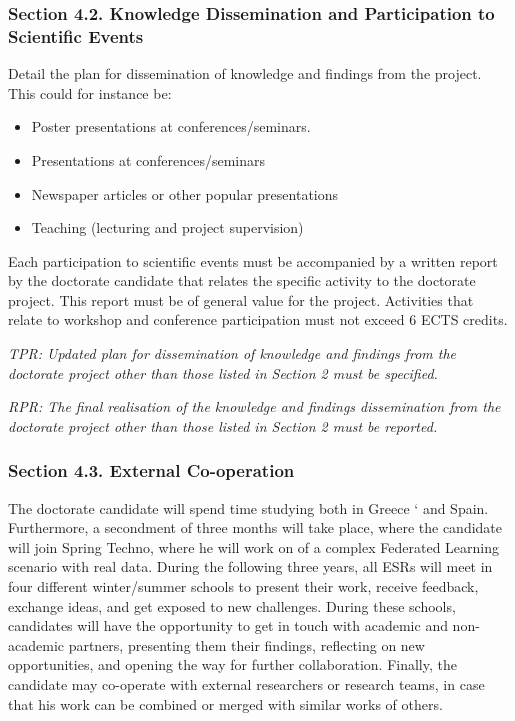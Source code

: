 \documentclass[12pt]{article}
\begin{document}
\subsubsection*{Section 4.2. Knowledge Dissemination and Participation to Scientific Events}

Detail the plan for dissemination of knowledge and findings from the project.\\

This could for instance be:
\begin{itemize}
\item Poster presentations at conferences/seminars.
\item Presentations at conferences/seminars
\item Newspaper articles or other popular presentations
\item Teaching (lecturing and project supervision)
\end{itemize}



Each participation to scientific events must be accompanied by a written report by the doctorate candidate that relates the specific activity to the doctorate project. This report must be of general value for the project. Activities that relate to workshop and conference participation must not exceed 6 ECTS credits.

\begin{shaded}
\noindent
\emph{TPR: Updated plan for dissemination of knowledge and findings from the doctorate project other than those listed in Section 2 must be specified. }

\noindent
\emph{RPR: The final realisation of the knowledge and findings dissemination from the doctorate project other than those listed in Section 2 must be reported. }
\end{shaded}

\subsubsection*{Section 4.3. External Co-operation}
The doctorate candidate will spend time studying both in Greece `
and Spain. Furthermore, a secondment of three months will take place, where the candidate will join
Spring Techno, where he will work on of a complex Federated Learning scenario with real data.
During the following three years, all ESRs will meet in four different winter/summer schools to present their work, receive feedback, exchange ideas, and get exposed to new challenges. During these schools, candidates will have the opportunity to get in touch with academic and non-academic partners, presenting them their findings, reflecting on new opportunities, and opening the way for further collaboration. Finally, the candidate may co-operate with external researchers or research teams, in case that his work can be combined or merged with similar works of others.
\end{document}
